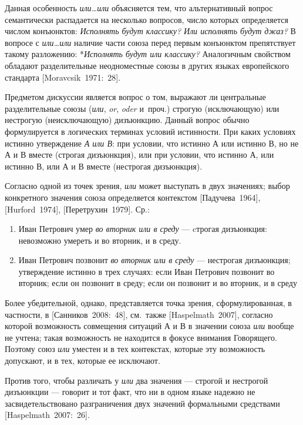 Данная особенность \textit{или\ldots или} объясняется тем, что
альтернативный вопрос семантически распадается на несколько вопросов,
число которых определяется числом конъюнктов: \textit{Исполнять будут
классику?} \textit{Или исполнять будут джаз?} В вопросе с
\textit{или\ldots или} наличие части союза перед первым конъюнктом
препятствует такому разложению: *\textit{Исполнять будут или классику?}
Аналогичным свойством обладают разделительные неодноместные союзы в
других языках европейского стандарта {[}Moravcsik~1971:~28{]}.

Предметом дискуссии является вопрос о том, выражают ли центральные
разделительные союзы (\textit{или}, \textit{or}, \textit{oder} и~проч.)
строгую (исключающую) или нестрогую (неисключающую) дизъюнкцию. Данный
вопрос обычно формулируется в логических терминах условий истинности.
При каких условиях истинно утверждение \textit{А или В}: при условии, что
истинно А или истинно В, но не А и В вместе (строгая дизъюнкция), или
при условии, что истинно А, или истинно В, или А и В вместе (нестрогая
дизъюнкция).

Согласно одной из точек зрения, \textit{или} может выступать в двух
значениях; выбор конкретного значения союза определяется контекстом
{[}Падучева~1964{]}, {[}Hurford~1974{]}, {[}Перетрухин~1979{]}. Ср.:

\begin{enumerate}
\def\labelenumi{(\arabic{enumi})}
\setcounter{enumi}{173}
\item
  Иван Петрович умер \textit{во вторник или в среду} --- cтрогая
  дизъюнкция: невозможно умереть и во вторник, и в среду.
\item
  Иван Петрович позвонит \textit{во вторник или в среду} --- нестрогая
  дизъюнкция; утверждение истинно в трех случаях: если Иван Петрович
  позвонит во вторник; если он позвонит в среду; если он позвонит и во
  вторник, и в среду
\end{enumerate}

Более убедительной, однако, представляется точка зрения,
сформулированная, в частности, в {[}Санников~2008:~48{]}, см.~также
{[}Haspelmath~2007{]}, согласно которой возможность совмещения ситуаций
А и В в значении союза \textit{или} вообще не учтена; такая возможность не
находится в фокусе внимания Говорящего. Поэтому союз \textit{или} уместен
и в тех контекстах, которые эту возможность допускают, и в тех, которые
ее исключают.

Против того, чтобы различать у \textit{или} два значения --- строгой и
нестрогой дизъюнкции --- говорит и тот факт, что ни в одном языке надежно
не засвидетельствовано разграничения двух значений формальными
средствами {[}Haspelmath~2007:~26{]}.

